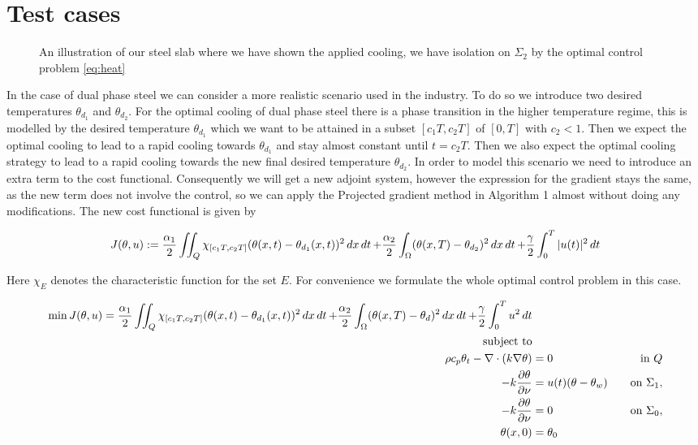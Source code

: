 \section{Test cases}
\begin{figure}
    \centering
    
    \caption{An illustration of our steel slab where we have shown the applied cooling, we have isolation on $\Sigma_2$ by the optimal control problem \eqref{eq:heat}}
    \label{fig:steel_slab}
\end{figure}

In the case of dual phase steel we can consider a more realistic scenario used in the industry. To do so we introduce two desired temperatures $\theta_{d_1}$ and $\theta_{d_2}$. For the optimal cooling of dual phase steel there is a phase transition in the higher temperature regime, this is modelled by the desired temperature $\theta_{d_1}$ which we want to be attained in a subset $[c_1T, c_2T]$ of $[0,T]$ with $c_2 <1$. Then we expect the optimal cooling to lead to a rapid cooling towards $\theta_{d_1}$ and stay almost constant until $t=c_2T$. Then we also expect the optimal cooling strategy to lead to a rapid cooling towards the new final desired temperature $\theta_{d_2}$. In order to model this scenario we need to introduce an extra term to the cost functional. Consequently we will get a new adjoint system, however the expression for the gradient stays the same, as the new term does not involve the control, so we can apply the Projected gradient method in Algorithm 1 almost without doing any modifications. The new cost functional is given by 

\begin{equation}
    \label{eq:new_cost}
    J(\theta,u) : = \frac{\alpha_1}{2}\iint_{Q}\chi_{[c_1T,c_2T]}(\theta(x,t) - \theta_{d_1}(x,t))^2 \mathop{dx}\mathop{dt} + \frac{\alpha_2}{2}\int_{\Omega} (\theta(x,T) - \theta_{d_2})^2 \mathop{dx}\mathop{dt} + \frac{\gamma}{2}\int_0^T|u(t)|^2\mathop{dt}
\end{equation}

Here $\chi_E$ denotes the characteristic function for the set $E$. For convenience we formulate the whole optimal control problem in this case. 

\begin{align*}
       \min J(\theta, u) = \frac{\alpha_1}{2}\iint_{Q}\chi_{[c_1T,c_2T]}(\theta(x,t) - \theta_{d_1}(x,t))^2 \mathop{dx}\mathop{dt} + \frac{\alpha_2}{2} \int_\Omega (\theta(x, T) - \theta_d)^2 \mathop{dx} \mathop{dt} + \frac{\gamma}{2} \int_0^{T} u^2 \mathop{dt} \\
       \text{subject to} \\
       \rho c_p \theta_t - \nabla \cdot (k \nabla \theta) &= 0 \quad &\text{in } Q  \\
      -k \frac{\partial \theta}{\partial \nu} &= u(t) (\theta - \theta_w) \quad &\text{on } \Sigma_1, \\
      -k \frac{\partial \theta}{\partial \nu} &= 0 \quad &\text{on } \Sigma_0, \\
      \theta(x, 0) &= \theta_0 &
\end{align*}

